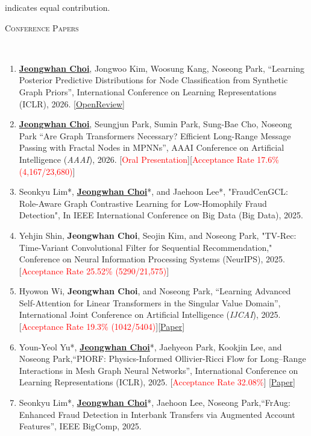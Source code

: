 \documentclass[10pt]{article}
\newenvironment{changemargin}[2]{
  \begin{list}{}{
    \setlength{\topsep}{0pt}
    \setlength{\leftmargin}{#1}
    \setlength{\rightmargin}{#2}
    \setlength{\listparindent}{\parindent}
    \setlength{\itemindent}{\parindent}
    \setlength{\parsep}{\parskip}
  }
  \item[]}{\end{list}
}
\newcommand{\lineover}{
	\begin{changemargin}{-0.05in}{-0.05in}
		\vspace*{-8pt}
		\hrulefill \\
		\vspace*{-2pt}
	\end{changemargin}
}
\newcommand{\RED}[1]{\textcolor{red}{#1}}
\newcommand{\textbu}[1]{\underline{\textbf{#1}}}
\newenvironment{body} {
	\vspace*{-16pt}
	\begin{changemargin}{-0.25in}{-0.5in}
  }
	{\end{changemargin}
}
\begin{document}
\begin{body}
	\vspace{14pt}
{\small * indicates equal contribution.}
	\vspace{14pt}

\textsc{Conference Papers}
\lineover
\begin{enumerate}
    \item \textbu{Jeongwhan Choi}, Jongwoo Kim, Woosung Kang, Noseong Park, ``Learning Posterior Predictive Distributions for Node Classification from Synthetic Graph Priors'', International Conference on Learning Representations (ICLR), 2026. [\href{https://openreview.net/forum?id=qkBBHixPow}{OpenReview}]
    \item \textbu{Jeongwhan Choi}, Seungjun Park, Sumin Park, Sung-Bae Cho, Noseong Park ``Are Graph Transformers Necessary? Efficient Long-Range Message Passing with Fractal Nodes in MPNNs'', AAAI Conference on Artificial Intelligence (\textit{AAAI}), 2026. [\RED{Oral Presentation}][\RED{Acceptance Rate 17.6\% (4,167/23,680)}] 
    \item Seonkyu Lim*, \textbu{Jeongwhan Choi}*, and Jaehoon Lee*, "FraudCenGCL: Role-Aware Graph Contrastive Learning for Low-Homophily Fraud Detection",  In IEEE International Conference on Big Data (Big Data), 2025.
    \item Yehjin Shin, \textbf{Jeongwhan Choi}, Seojin Kim, and Noseong Park, "TV-Rec: Time-Variant Convolutional Filter for Sequential Recommendation,"  Conference on Neural Information Processing Systems (NeurIPS), 2025.  [\RED{Acceptance Rate 25.52\% (5290/21,575)}]
    \item Hyowon Wi, \textbf{Jeongwhan Choi}, and Noseong Park, ``Learning Advanced Self-Attention for Linear Transformers in the Singular Value Domain'', International Joint Conference on Artificial Intelligence (\textit{IJCAI}), 2025. [\RED{Acceptance Rate 19.3\% (1042/5404)}][\href{https://www.ijcai.org/proceedings/2025/0730}{Paper}]
    \item Youn-Yeol Yu*, \textbu{Jeongwhan Choi}*, Jaehyeon Park, Kookjin Lee, and Noseong Park,``PIORF: Physics-Informed Ollivier-Ricci Flow for Long–Range Interactions in Mesh Graph Neural Networks'', International Conference on Learning Representations (ICLR), 2025. [\RED{Acceptance Rate 32.08\%}] [\href{https://openreview.net/forum?id=qkBBHixPow}{Paper}]
    \item Seonkyu Lim*, \textbu{Jeongwhan Choi}*, Jaehoon Lee, Noseong Park,``FrAug: Enhanced Fraud Detection in Interbank Transfers via Augmented Account Features'', IEEE BigComp, 2025.

\end{enumerate}
\end{body}
\end{document}
